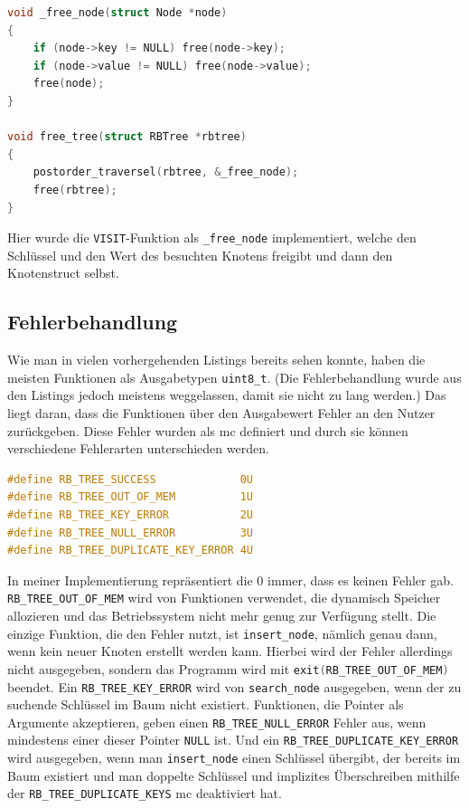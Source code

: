 \documentclass[11pt]{article}
\newcommand{\lstin}[1]{\lstinline[language=C]{#1}}
\begin{document}
\begin{lstlisting}[language=C]
void _free_node(struct Node *node)
{
    if (node->key != NULL) free(node->key);
    if (node->value != NULL) free(node->value);
    free(node);
}

void free_tree(struct RBTree *rbtree)
{
    postorder_traversel(rbtree, &_free_node);
    free(rbtree);
}
\end{lstlisting}

Hier wurde die \lstin{VISIT}-Funktion als \lstin{_free_node} implementiert, welche den Schlüssel und den Wert des besuchten Knotens freigibt und dann den Knotenstruct selbst.

\subsection{Fehlerbehandlung} \label{err}
Wie man in vielen vorhergehenden Listings bereits sehen konnte, haben die meisten Funktionen als Ausgabetypen \lstin{uint8_t}. (Die Fehlerbehandlung wurde aus den Listings jedoch meistens weggelassen, damit sie nicht zu lang werden.)
Das liegt daran, dass die Funktionen über den Ausgabewert Fehler an den Nutzer zurückgeben. Diese Fehler wurden als \gls{mc} definiert und durch sie können verschiedene Fehlerarten unterschieden werden.

\begin{lstlisting}[language=C]
#define RB_TREE_SUCCESS             0U
#define RB_TREE_OUT_OF_MEM          1U
#define RB_TREE_KEY_ERROR           2U
#define RB_TREE_NULL_ERROR          3U
#define RB_TREE_DUPLICATE_KEY_ERROR 4U
\end{lstlisting}

In meiner Implementierung repräsentiert die 0 immer, dass es keinen Fehler gab.
\lstin{RB_TREE_OUT_OF_MEM} wird von Funktionen verwendet, die dynamisch Speicher allozieren und das Betriebssystem nicht mehr genug zur Verfügung stellt.
Die einzige Funktion, die den Fehler nutzt, ist \lstin{insert_node}, nämlich genau dann, wenn kein neuer Knoten erstellt werden kann.
Hierbei wird der Fehler allerdings nicht ausgegeben, sondern das Programm wird mit \lstin{exit(RB_TREE_OUT_OF_MEM)} beendet.
Ein \lstin{RB_TREE_KEY_ERROR} wird von \lstin{search_node} ausgegeben, wenn der zu suchende Schlüssel im Baum nicht existiert.
Funktionen, die Pointer als Argumente akzeptieren, geben einen \lstin{RB_TREE_NULL_ERROR} Fehler aus, wenn mindestens einer dieser Pointer \lstin{NULL} ist.
Und ein \lstin{RB_TREE_DUPLICATE_KEY_ERROR} wird ausgegeben, wenn man \lstin{insert_node} einen Schlüssel übergibt, der bereits im Baum existiert und man doppelte Schlüssel und implizites Überschreiben mithilfe der \lstin{RB_TREE_DUPLICATE_KEYS} \gls{mc} deaktiviert hat.
\end{document}
